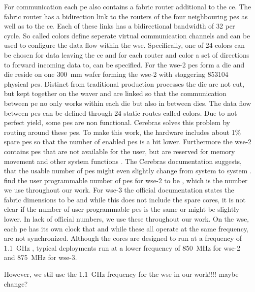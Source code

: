 For communication each \ac{pe} also contains a fabric router additional to the \ac{ce}. The fabric router has a bidirection link to the routers of the four neighbouring \acp{pe} as well as to the \ac{ce}. Each of these links has a bidirectional bandwidth of \qty{32}{\bit} per cycle. So called colors define seperate virtual communication channels and can be used to configure the data flow within the \ac{wse}. Specifically, one of 24 colors can be chosen for data leaving the \ac{ce} and for each router and color a set of directions to forward incoming data to, can be specified. For the \ac{wse}-2  \acp{pe} form a die and  die reside on one \qty{300}{\mm} wafer forming the \ac{wse}-2 with staggering \num{853104} physical \acp{pe}. Distinct from traditional production processes the die are not cut, but kept together on the waver and are linked so that the communication between \ac{pe} no only works within each die but also in between dies.
The data flow between \acp{pe} can be defined through 24 static routes called colors.\cite{lie2023cerebras}
Due to not perfect yield, some \acp{pe} are non functional.
Cerebras solves this problem by routing around these \acp{pe}. 
To make this work, the hardware includes about 1\% spare \acp{pe} so that the number of enabled \acp{pe} is a bit lower. Furthermore the \ac{wse}-2 contains \acp{pe} that are not available for the user, but are reserved for memory movement and other system functions \cite{tramm2024efficient}.
The Cerebras documentation suggests, that the usable number of \acp{pe} might even slightly change from system to system \cite{cerebras_gemv_tutorial}. \textcite{tramm2024efficient} find the user programmable number of \acp{pe} for \ac{wse}-2 to be , which is the number we use throughout our work. For \ac{wse}-3 the official documentation states the fabric dimensions to be  and while this does not include the spare cores, it is not clear if the number of user-programmable \acp{pe} is the same or might be slightly lower. In lack of official numbers, we use these throughout our work. On the \ac{wse}, each \ac{pe} has its own clock that and while these all operate at the same frequency, are not synchronized. Although the cores are designed to run at a frequency of \qty{1.1}{\giga\hertz} \cite{lie2023cerebras}, typical deployments run at a lower frequency of \qty{850}{\mega\hertz} for \ac{wse}-2 \cite{tramm2024efficient} and \qty{875}{\mega\hertz} for \ac{wse}-3.

However, we stil use the \qty{1.1}{\giga\hertz} frequency for the \ac{wse} in our work!!!! maybe change?

